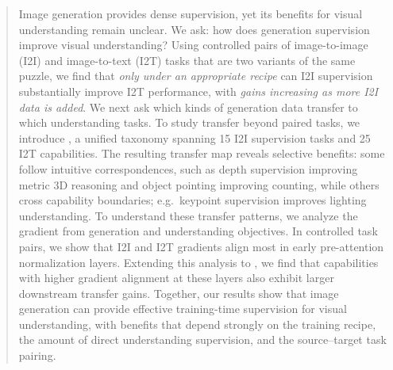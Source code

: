 \begin{abstract}
Image generation provides dense supervision, yet its benefits for visual understanding remain unclear.
We ask: how does generation supervision improve visual understanding?
Using controlled pairs of image-to-image (I2I) and image-to-text (I2T) tasks that are two variants of the same puzzle, we find that \textit{only under an appropriate recipe} can I2I supervision substantially improve I2T performance, with \textit{gains increasing as more I2I data is added}.
We next ask which kinds of generation data transfer to which understanding tasks.
To study transfer beyond paired tasks, we introduce \methodname, a unified taxonomy spanning 15 I2I supervision tasks and 25 I2T capabilities. The resulting transfer map reveals selective benefits: some follow intuitive correspondences, such as depth supervision improving metric 3D reasoning and object pointing improving counting, while others cross capability boundaries; e.g.~keypoint supervision improves lighting understanding.
To understand these transfer patterns, we analyze the gradient from generation and understanding objectives. 
In controlled task pairs, we show that I2I and I2T gradients align most in early pre-attention normalization layers.
Extending this analysis to \methodname, we find that capabilities with higher gradient alignment at these layers also exhibit larger downstream transfer gains.
Together, our results show that image generation can provide effective training-time supervision for visual understanding, with benefits that depend strongly on the training recipe, the amount of direct understanding supervision, and the source–target task pairing.
\end{abstract}









